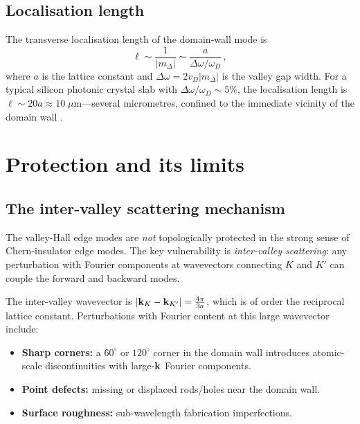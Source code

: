 \subsection{Localisation length}
\label{sec:ch12-localisation}

The transverse localisation length of the domain-wall mode is
\begin{equation}
  \ell \sim \frac{1}{|m_\Delta|} \sim \frac{a}{\Delta\omega/\omega_D}\,,
\end{equation}
where $a$ is the lattice constant and $\Delta\omega=2v_D|m_\Delta|$ is
the valley gap width.  For a typical silicon photonic crystal slab with
$\Delta\omega/\omega_D\sim 5\%$, the localisation length is
$\ell\sim 20a\approx 10\;\mu\mathrm{m}$---several micrometres, confined
to the immediate vicinity of the domain wall
\cite{he2016photonic} \cite{he2019silicon}.

\section{Protection and its limits}
\label{sec:ch12-protection}

\subsection{The inter-valley scattering mechanism}
\label{sec:ch12-intervalley}

The valley-Hall edge modes are \emph{not} topologically protected in the
strong sense of Chern-insulator edge modes.  The key vulnerability is
\emph{inter-valley scattering}: any perturbation with Fourier components
at wavevectors connecting $K$ and $K'$ can couple the forward and
backward modes.

The inter-valley wavevector is
$|\mathbf{k}_K-\mathbf{k}_{K'}|=\frac{4\pi}{3a}$, which is of order the
reciprocal lattice constant.  Perturbations with Fourier content at
this large wavevector include:
\begin{itemize}
  \item \textbf{Sharp corners:} a $60^\circ$ or $120^\circ$ corner in
  the domain wall introduces atomic-scale discontinuities with
  large-$\mathbf{k}$ Fourier components.
  \item \textbf{Point defects:} missing or displaced rods/holes near
  the domain wall.
  \item \textbf{Surface roughness:} sub-wavelength fabrication
  imperfections.
\end{itemize}

